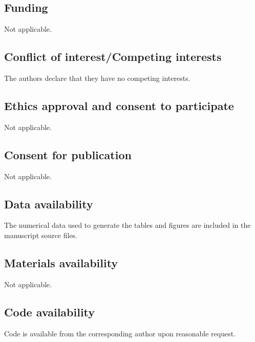 \documentclass[pdflatex,sn-mathphys-num]{sn-jnl}
\theoremstyle{thmstyleone}%
\theoremstyle{thmstylethree}%
\theoremstyle{thmstyletwo}%
\begin{document}
\subsection*{Funding}
Not applicable.

\subsection*{Conflict of interest/Competing interests}
The authors declare that they have no competing interests.

\subsection*{Ethics approval and consent to participate}
Not applicable.

\subsection*{Consent for publication}
Not applicable.

\subsection*{Data availability}
The numerical data used to generate the tables and figures are included in the manuscript source files.

\subsection*{Materials availability}
Not applicable.

\subsection*{Code availability}
Code is available from the corresponding author upon reasonable request.
\end{document}
